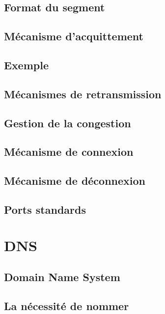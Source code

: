 \documentclass[12pt]{article}
\begin{document}
\subsection{Format du segment}

\subsection{Mécanisme d’acquittement}


\subsection{Exemple}


\subsection{Mécanismes de retransmission}


\subsection{Gestion de la congestion}


\subsection{Mécanisme de connexion}


\subsection{Mécanisme de déconnexion}



\subsection{Ports standards}


\section{DNS}


\subsection{Domain Name System}


\subsection{La nécessité de nommer}
\end{document}
